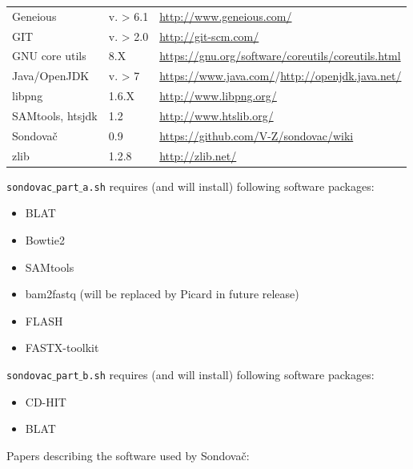 \documentclass[a4paper, 11pt, twoside]{article}
\begin{document}
\begin{table}[htb]
\begin{tabular}{lll}
Geneious & v. > 6.1 & \href{http://www.geneious.com/}{http://www.geneious.com/}\\
GIT & v. > 2.0 & \href{http://git-scm.com/}{http://git-scm.com/}\\
GNU core utils & 8.X & \href{https://gnu.org/software/coreutils/coreutils.html}{https://gnu.org/software/coreutils/coreutils.html}\\
Java/OpenJDK & v. > 7 & \href{https://www.java.com/}{https://www.java.com/}/\href{http://openjdk.java.net/}{http://openjdk.java.net/}\\
libpng & 1.6.X & \href{http://www.libpng.org/}{http://www.libpng.org/}\\
SAMtools, htsjdk & 1.2 & \href{http://www.htslib.org/}{http://www.htslib.org/}\\
Sondovač & 0.9 & \href{https://github.com/V-Z/sondovac/wiki}{https://github.com/V-Z/sondovac/wiki}\\
zlib & 1.2.8 & \href{http://zlib.net/}{http://zlib.net/}
\end{tabular}
\label{software-links}
\end{table}

\texttt{sondovac$\_$part$\_$a.sh} requires (and will install) following software packages:

\begin{itemize}
  \item BLAT
  \item Bowtie2
  \item SAMtools
  \item bam2fastq (will be replaced by Picard in future release)
  \item FLASH
  \item FASTX-toolkit
\end{itemize}

\texttt{sondovac$\_$part$\_$b.sh} requires (and will install) following software packages:

\begin{itemize}
  \item CD-HIT
  \item BLAT
\end{itemize}

Papers describing the software used by Sondovač:
\end{document}
